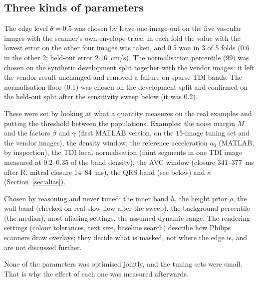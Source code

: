 \documentclass[11pt,a4paper]{article}
\begin{document}
\subsection{Three kinds of parameters}
\begin{description}[leftmargin=1em]
\item[Fitted to data (3).] The edge level $\theta = 0.5$ was chosen by leave-one-image-out on the five vascular images
with the scanner's own envelope trace: in each fold the value with the lowest error on the other four images was
taken, and 0.5 won in 3 of 5 folds (0.6 in the other 2; held-out error 2.16~cm/s). The normalisation percentile (99)
was chosen on the synthetic development split together with the vendor images: it left the vendor result unchanged
and removed a failure on sparse TDI bands. The normalisation floor (0.1) was chosen on the development split and
confirmed on the held-out split after the sensitivity sweep below (it was 0.2).
\item[Measured on example images (about 10).] These were set by looking at what a quantity measures on the real
examples and putting the threshold between the populations. Examples: the noise margin $M$ and the factors $\beta$
and $\gamma$ (first MATLAB version, on the 15-image tuning set and the vendor images), the density window, the
reference acceleration $a_0$ (MATLAB, by inspection), the TDI local normalisation (faint segments in one TDI image
measured at 0.2--0.35 of the band density), the AVC window (closure 341--377~ms after R, mitral closure 14--84~ms), the QRS band (see below)
and $\kappa$ (Section~\ref{sec:alias}).
\item[A-priori defaults (the rest).] Chosen by reasoning and never tuned: the inner band $h$, the height prior $\rho$,
the wall band (checked on real slow flow after the sweep), the background percentile (the median), most aliasing settings, the assumed
dynamic range. The rendering settings (colour tolerances, text size, baseline search) describe how Philips scanners
draw overlays; they decide what is masked, not where the edge is, and are not discussed further.
\end{description}
\noindent None of the parameters was optimised jointly, and the tuning sets were small. That is why the effect of
each one was measured afterwards.
\end{document}
